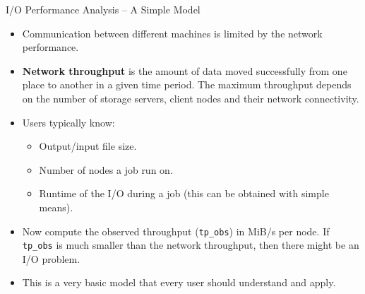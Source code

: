 \documentclass[compress,11pt,xcolor=svgnames,aspectratio=169]{beamer}
\begin{document}

\begin{frame}[fragile]{I/O Performance Analysis -- A Simple Model}

\begin{itemize}
\setlength\itemsep{0.3cm}

  \item Communication between different machines is limited by the network performance.

  \item \textbf{Network throughput} is the amount of data moved successfully from one place to another in a given time period. The maximum throughput depends on the number of storage servers, client nodes and their network connectivity.

  \item Users typically know:

    \begin{itemize}
      \item Output/input file size.
      \item Number of nodes a job run on.
      \item Runtime of the I/O during a job (this can be obtained with simple means).
    \end{itemize}

  \item Now compute the observed throughput (\verb|tp_obs|) in MiB/s per node. If \verb|tp_obs| is much smaller than the network throughput, then there might be an I/O problem.

  \item This is a very basic model that every user should understand and apply.

\end{itemize}

\end{frame}
\end{document}
